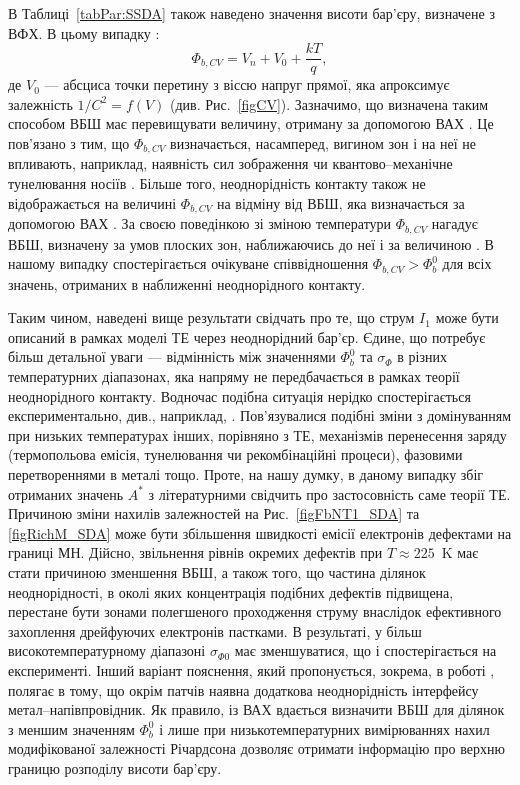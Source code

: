 В Таблиці~\ref{tabPar:SSDA} також наведено значення висоти бар'єру, визначене з ВФХ.
В цьому випадку  \cite{Rhoderick1988,Schroder2006}:
\begin{equation}\label{eqFbCV}
\Phi_{b,CV}=V_n+V_0+\frac{kT}{q},
\end{equation}
де
$V_0$ --- абсциса точки перетину з віссю напруг прямої, яка апроксимує залежність $1/C^2=f(V)$ (див. Рис.~\ref{figCV}).
Зазначимо, що визначена таким способом ВБШ має перевищувати величину, отриману за допомогою ВАХ
\cite{Rhoderick1988,GELCZUK2014,Mohan,Cetin2005,Soylu,Yildirim2010,Karatas:2006NIMA}.
Це пов'язано з тим, що $\Phi_{b,CV}$ визначається, насамперед, вигином зон і на неї не впливають, наприклад,
наявність сил зображення чи квантово--механічне тунелювання носіїв \cite{Rhoderick1988,GELCZUK2014,Mohan}.
Більше того, неоднорідність контакту також не відображається на величині $\Phi_{b,CV}$ на відміну від ВБШ,
яка визначається за допомогою ВАХ \cite{Sullivan,Tung:PhysRev,GELCZUK2014,Mohan}.
За своєю поведінкою зі зміною температури $\Phi_{b,CV}$ нагадує ВБШ, визначену за умов плоских зон, наближаючись
до неї і за величиною \cite{Cetin2005,Soylu,Yildirim2010,Mohan}.
В нашому випадку спостерігається очікуване співвідношення $\Phi_{b,CV}>\Phi_b^0$ для всіх значень, отриманих
в наближенні неоднорідного контакту.

Таким чином, наведені вище результати свідчать про те, що струм $I_1$ може бути описаний в рамках моделі ТЕ через неоднорідний бар'єр.
Єдине, що потребує більш детальної уваги --- відмінність між значеннями $\Phi_b^0$ та  $\sigma_{\Phi}$ в різних температурних діапазонах,
яка напряму не передбачається в рамках теорії неоднорідного контакту.
Водночас подібна ситуація нерідко спостерігається експериментально, див., наприклад,
\cite{Tascioglu2010old,Yildirim2010,Mamor,Jiang:DGJap,JYOTHI2015,DURMUS2014,KHURE2015,OZAVCI2013,Tung:ApplPhysRev}.
Пов'язувалися подібні зміни  з домінуванням при низьких температурах інших, порівняно з ТЕ, механізмів перенесення заряду
(термопольова емісія, тунелювання чи рекомбінаційні процеси), фазовими перетвореннями в металі тощо.
Проте, на нашу думку, в даному випадку збіг  отриманих значень $A^*$ з літературними свідчить про застосовність саме теорії ТЕ.
Причиною зміни нахилів залежностей на Рис.~\ref{figFbNT1_SDA} та \ref{figRichM_SDA} може бути збільшення швидкості емісії електронів дефектами на границі МН.
Дійсно, звільнення рівнів окремих дефектів при $T\approx225$~K має стати причиною зменшення ВБШ, а також того,
що частина ділянок неоднорідності, в околі яких концентрація подібних дефектів підвищена, перестане бути зонами полегшеного проходження струму внаслідок ефективного захоплення дрейфуючих електронів пастками.
В результаті, у більш високотемпературному діапазоні $\sigma_{\Phi0}$ має зменшуватися, що і спостерігається на експерименті.
Інший варіант пояснення, який пропонується, зокрема, в роботі \cite{Tung:ApplPhysRev},
полягає в тому, що окрім патчів наявна додаткова неоднорідність інтерфейсу метал--напівпровідник.
Як правило, із ВАХ вдається визначити ВБШ для ділянок з меншим значенням $\Phi_b^0$ і лише при низькотемпературних вимірюваннях
нахил модифікованої залежності Річардсона дозволяє отримати інформацію про верхню границю розподілу висоти бар'єру.


